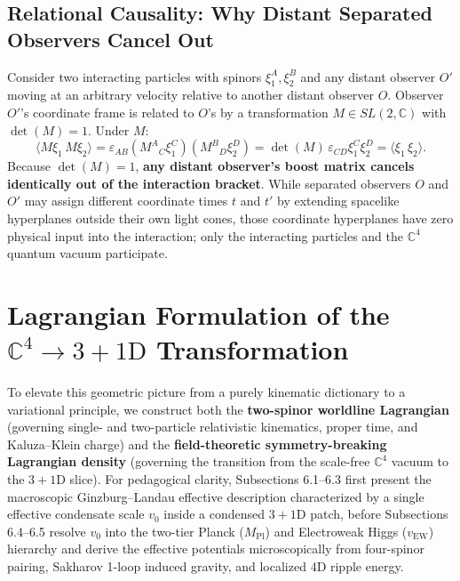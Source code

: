 \documentclass[11pt,a4paper]{article}
\begin{document}
\subsection{Relational Causality: Why Distant Separated Observers Cancel Out}
Consider two interacting particles with spinors $\xi_1^A, \xi_2^B$ and any distant observer $O'$ moving at an arbitrary velocity relative to another distant observer $O$. Observer $O'$'s coordinate frame is related to $O$'s by a transformation $M \in SL(2,\mathbb{C})$ with $\det(M) = 1$. Under $M$:
\begin{equation}
\langle M\xi_1 \, M\xi_2 \rangle = \varepsilon_{AB} (M^A{}_C \xi_1^C)(M^B{}_D \xi_2^D) = \det(M)\, \varepsilon_{CD}\xi_1^C \xi_2^D = \langle \xi_1 \, \xi_2 \rangle.
\end{equation}
Because $\det(M) = 1$, \textbf{any distant observer's boost matrix cancels identically out of the interaction bracket}. While separated observers $O$ and $O'$ may assign different coordinate times $t$ and $t'$ by extending spacelike hyperplanes outside their own light cones, those coordinate hyperplanes have zero physical input into the interaction; only the interacting particles and the $\mathbb{C}^4$ quantum vacuum participate.

\section{Lagrangian Formulation of the \texorpdfstring{$\mathbb{C}^4 \to 3+1\text{D}$}{C4 to 3+1D} Transformation}

To elevate this geometric picture from a purely kinematic dictionary to a variational principle, we construct both the \textbf{two-spinor worldline Lagrangian} (governing single- and two-particle relativistic kinematics, proper time, and Kaluza--Klein charge) and the \textbf{field-theoretic symmetry-breaking Lagrangian density} (governing the transition from the scale-free $\mathbb{C}^4$ vacuum to the $3+1\text{D}$ slice). For pedagogical clarity, Subsections 6.1--6.3 first present the macroscopic Ginzburg--Landau effective description characterized by a single effective condensate scale $v_0$ inside a condensed $3+1\text{D}$ patch, before Subsections 6.4--6.5 resolve $v_0$ into the two-tier Planck ($M_{\text{Pl}}$) and Electroweak Higgs ($v_{\text{EW}}$) hierarchy and derive the effective potentials microscopically from four-spinor pairing, Sakharov 1-loop induced gravity, and localized 4D ripple energy.
\end{document}
